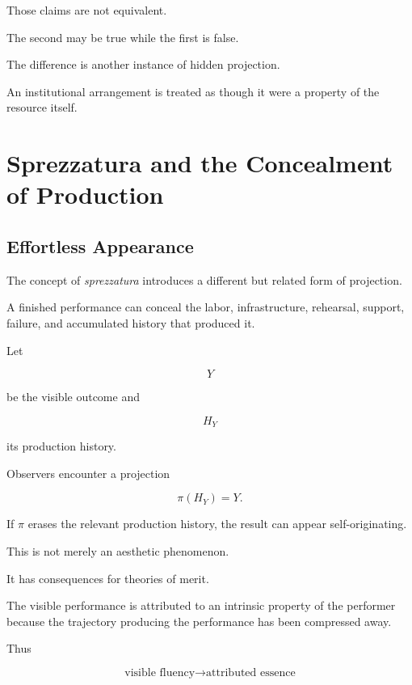 \documentclass[11pt]{article}
\theoremstyle{remark}
\begin{document}
Those claims are not equivalent.

The second may be true while the first is false.

The difference is another instance of hidden projection.

An institutional arrangement is treated as though it were a property of the resource itself.

\section{Sprezzatura and the Concealment of Production}

\subsection{Effortless Appearance}

The concept of \emph{sprezzatura} introduces a different but related form of projection.

A finished performance can conceal the labor, infrastructure, rehearsal, support, failure, and accumulated history that produced it.

Let

\begin{equation}
Y
\end{equation}

be the visible outcome and

\begin{equation}
H_Y
\end{equation}

its production history.

Observers encounter a projection

\begin{equation}
\pi(H_Y)=Y.
\end{equation}

If $\pi$ erases the relevant production history, the result can appear self-originating.

This is not merely an aesthetic phenomenon.

It has consequences for theories of merit.

The visible performance is attributed to an intrinsic property of the performer because the trajectory producing the performance has been compressed away.

Thus

\begin{equation}
\text{visible fluency}
\rightarrow
\text{attributed essence}
\end{equation}
\end{document}
